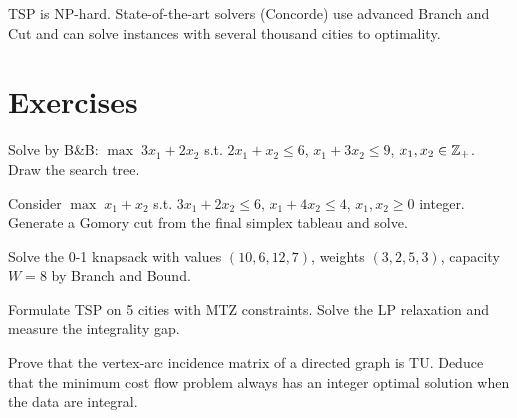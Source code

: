 \begin{warning}[title=\textbf{TSP complexity}]
TSP is NP-hard. State-of-the-art solvers (Concorde) use advanced Branch and
Cut and can solve instances with several thousand cities to optimality.
\end{warning}

\section{Exercises}

\begin{exercise}
Solve by B\&B: $\max\; 3x_1 + 2x_2$ s.t. $2x_1 + x_2 \leq 6$,
$x_1 + 3x_2 \leq 9$, $x_1, x_2 \in \mathbb{Z}_+$. Draw the search tree.
\end{exercise}

\begin{exercise}
Consider $\max\; x_1 + x_2$ s.t. $3x_1 + 2x_2 \leq 6$,
$x_1 + 4x_2 \leq 4$, $x_1, x_2 \geq 0$ integer. Generate a Gomory cut from
the final simplex tableau and solve.
\end{exercise}

\begin{exercise}
Solve the 0-1 knapsack with values $(10, 6, 12, 7)$, weights $(3, 2, 5, 3)$,
capacity $W = 8$ by Branch and Bound.
\end{exercise}

\begin{exercise}
Formulate TSP on 5 cities with MTZ constraints. Solve the LP relaxation and
measure the integrality gap.
\end{exercise}

\begin{exercise}
Prove that the vertex-arc incidence matrix of a directed graph is TU. Deduce
that the minimum cost flow problem always has an integer optimal solution when
the data are integral.
\end{exercise}
